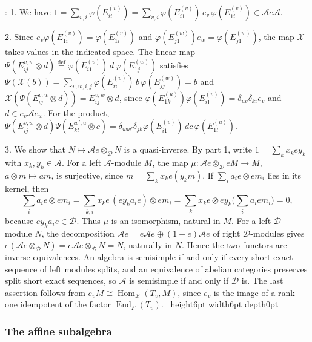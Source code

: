 \documentclass[leqno]{article}
\newcommand{\qed}{\hfill \vrule height6pt  width6pt depth0pt}
\newcommand{\co}{\colon}
\newcommand{\ot}{\otimes}
\newcommand{\ov}{\overset}
\newenvironment{proof}[1][]{\noindent {\it Proof #1} : }{\hbox{~}\qed
\smallskip
}
\numberwithin{equation}{section}
\begin{document}
\begin{proof}
1. We have $1 = \sum_{v,i} \varphi(E^{(v)}_{ii}) = \sum_{v,i} \varphi(E^{(v)}_{i1})\, e_v\, \varphi(E^{(v)}_{1i}) \in \mathcal A e \mathcal A$.

2. Since $e_v \varphi(E^{(v)}_{1i}) = \varphi(E^{(v)}_{1i})$ and $\varphi(E^{(w)}_{j1}) e_w = \varphi(E^{(w)}_{j1})$, the map $\mathcal X$ takes values in the indicated space. The linear map $\Psi(E^{v,w}_{ij} \ot d) \ov{\mathrm{def}}{=} \varphi(E^{(v)}_{i1})\, d\, \varphi(E^{(w)}_{1j})$ satisfies $\Psi(\mathcal X(b)) = \sum_{v,w,i,j} \varphi(E^{(v)}_{ii})\, b\, \varphi(E^{(w)}_{jj}) = b$ and $\mathcal X(\Psi(E^{v,w}_{ij} \ot d)) = E^{v,w}_{ij} \ot d$, since $\varphi(E^{(u)}_{1k}) \varphi(E^{(v)}_{i1}) = \delta_{uv}\delta_{ki} e_v$ and $d \in e_v \mathcal A e_w$. For the product, $\Psi(E^{v,w}_{ij} \ot d)\Psi(E^{w',u}_{kl} \ot c) = \delta_{ww'}\delta_{jk} \varphi(E^{(v)}_{i1})\, d c\, \varphi(E^{(u)}_{1l})$.

3. We show that $N \mapsto \mathcal A e \ot_{\mathcal D} N$ is a quasi-inverse. By part 1, write $1 = \sum_k x_k e y_k$ with $x_k, y_k \in \mathcal A$. For a left $\mathcal A$-module $M$, the map $\mu \co \mathcal A e \ot_{\mathcal D} eM \to M$, $a \ot m \mapsto am$, is surjective, since $m = \sum_k x_k e (y_k m)$. If $\sum_i a_i e \ot e m_i$ lies in its kernel, then
\[
\sum_i a_i e \ot e m_i = \sum_{k,i} x_k e\, (e y_k a_i e) \ot e m_i = \sum_k x_k e \ot e y_k \Big(\sum_i a_i e m_i\Big) = 0,
\]
because $e y_k a_i e \in \mathcal D$. Thus $\mu$ is an isomorphism, natural in $M$. For a left $\mathcal D$-module $N$, the decomposition $\mathcal A e = e\mathcal A e \oplus (1-e)\mathcal A e$ of right $\mathcal D$-modules gives $e(\mathcal A e \ot_{\mathcal D} N) = e \mathcal A e \ot_{\mathcal D} N = N$, naturally in $N$. Hence the two functors are inverse equivalences. An algebra is semisimple if and only if every short exact sequence of left modules splits, and an equivalence of abelian categories preserves split short exact sequences, so $\mathcal A$ is semisimple if and only if $\mathcal D$ is. The last assertion follows from $e_v M \cong \operatorname{Hom}_{\mathcal B}(T_v, M)$, since $e_v$ is the image of a rank-one idempotent of the factor $\operatorname{End}_F(T_v)$.
\end{proof}

\subsubsection{The affine subalgebra}
\label{zhu:subsec:affine}
\end{document}
